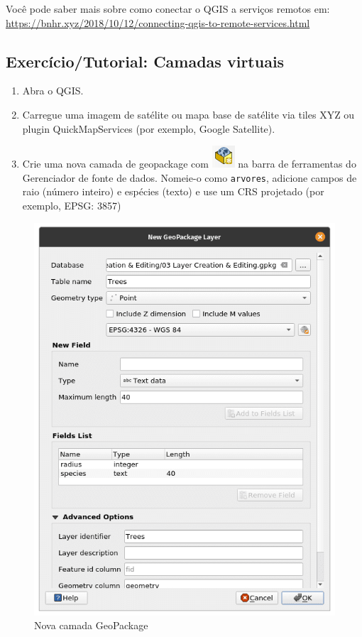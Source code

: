 \documentclass[
]{krantz}
\providecommand{\tightlist}{%
  \setlength{\itemsep}{0pt}\setlength{\parskip}{0pt}}
\begin{document}
Você pode saber mais sobre como conectar o QGIS a serviços remotos em: \href{https://bnhr.xyz/2018/\%2012/10\%20/\%20Connecting-qgis-to-remote-services.html}{https://bnhr.xyz/2018/10/12/connecting-qgis-to-remote-services.html}

\hypertarget{exercuxedciotutorial-camadas-virtuais}{%
\subsection{Exercício/Tutorial: Camadas virtuais}\label{exercuxedciotutorial-camadas-virtuais}}

\begin{enumerate}
\def\labelenumi{\arabic{enumi}.}
\tightlist
\item
  Abra o QGIS.
\item
  Carregue uma imagem de satélite ou mapa base de satélite via tiles XYZ ou plugin QuickMapServices (por exemplo, Google Satellite).
\item
  Crie uma nova camada de geopackage com \includegraphics{media/modulo2/symbol-gpkg.png} na barra de ferramentas do Gerenciador de fonte de dados. Nomeie-o como \texttt{arvores}, adicione campos de raio (número inteiro) e espécies (texto) e use um CRS projetado (por exemplo, EPSG: 3857)
\end{enumerate}

\begin{figure}
\centering
\includegraphics{media/modulo2/virtual-1.png}
\caption{Nova camada GeoPackage}
\end{figure}
\end{document}
